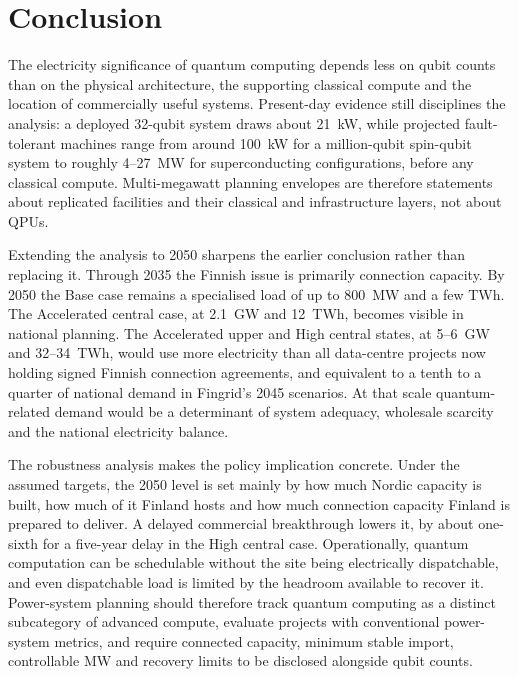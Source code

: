 \documentclass[11pt,a4paper]{article}
\begin{document}
\section{Conclusion}
The electricity significance of quantum computing depends less on qubit counts than on the physical architecture, the supporting classical compute and the location of commercially useful systems. Present-day evidence still disciplines the analysis: a deployed 32-qubit system draws about 21~kW, while projected fault-tolerant machines range from around 100~kW for a million-qubit spin-qubit system to roughly 4--27~MW for superconducting configurations, before any classical compute. Multi-megawatt planning envelopes are therefore statements about replicated facilities and their classical and infrastructure layers, not about QPUs.

Extending the analysis to 2050 sharpens the earlier conclusion rather than replacing it. Through 2035 the Finnish issue is primarily connection capacity. By 2050 the Base case remains a specialised load of up to 800~MW and a few TWh. The Accelerated central case, at 2.1~GW and 12~TWh, becomes visible in national planning. The Accelerated upper and High central states, at 5--6~GW and 32--34~TWh, would use more electricity than all data-centre projects now holding signed Finnish connection agreements, and equivalent to a tenth to a quarter of national demand in Fingrid's 2045 scenarios. At that scale quantum-related demand would be a determinant of system adequacy, wholesale scarcity and the national electricity balance.

The robustness analysis makes the policy implication concrete. Under the assumed targets, the 2050 level is set mainly by how much Nordic capacity is built, how much of it Finland hosts and how much connection capacity Finland is prepared to deliver. A delayed commercial breakthrough lowers it, by about one-sixth for a five-year delay in the High central case. Operationally, quantum computation can be schedulable without the site being electrically dispatchable, and even dispatchable load is limited by the headroom available to recover it. Power-system planning should therefore track quantum computing as a distinct subcategory of advanced compute, evaluate projects with conventional power-system metrics, and require connected capacity, minimum stable import, controllable MW and recovery limits to be disclosed alongside qubit counts.
\end{document}
